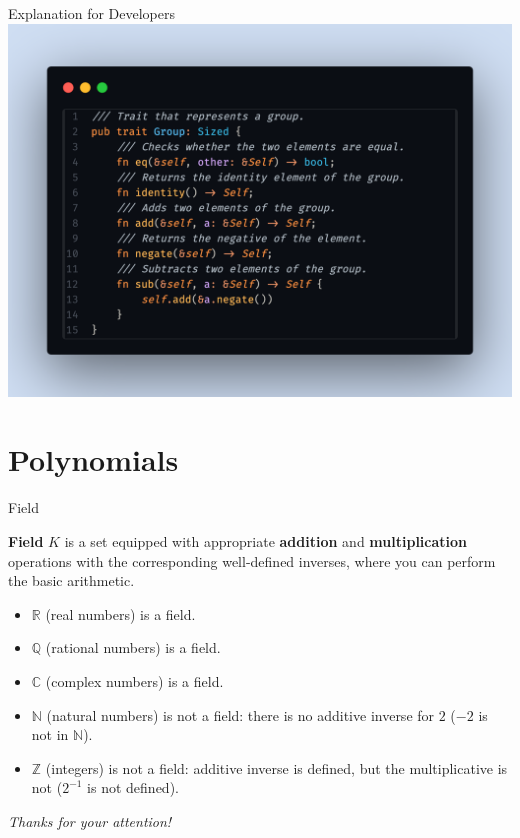 \documentclass{beamer}
\begin{document}
    \begin{frame}{Explanation for Developers}
      \includegraphics[width=\textwidth]{images/lecture_1/group_in_rust.png}
    \end{frame}

    \section{Polynomials}

      \begin{frame}{Field}
          \begin{definition}{}
              \textbf{Field} $K$ is a set equipped with appropriate \textbf{addition} and \textbf{multiplication} operations with the corresponding well-defined inverses, where you can perform the basic arithmetic.
          \end{definition}
          \pause
          \begin{exampleblock}{}
              \begin{itemize}
                  \item $\mathbb{R}$ (real numbers) is a field.
                  \item $\mathbb{Q}$ (rational numbers) is a field.
                  \item $\mathbb{C}$ (complex numbers) is a field.
                  \item $\mathbb{N}$ (natural numbers) is not a field: there is no additive inverse for $2$ ($-2$ is not in $\mathbb{N}$).
                  \item $\mathbb{Z}$ (integers) is not a field: additive inverse is defined, but the multiplicative is not ($2^{-1}$ is not defined).
              \end{itemize}
          \end{exampleblock}
      \end{frame}
  
    \begin{frame}{}
        \centering \Large
        \emph{Thanks for your attention!}
      \end{frame}
\end{document}

